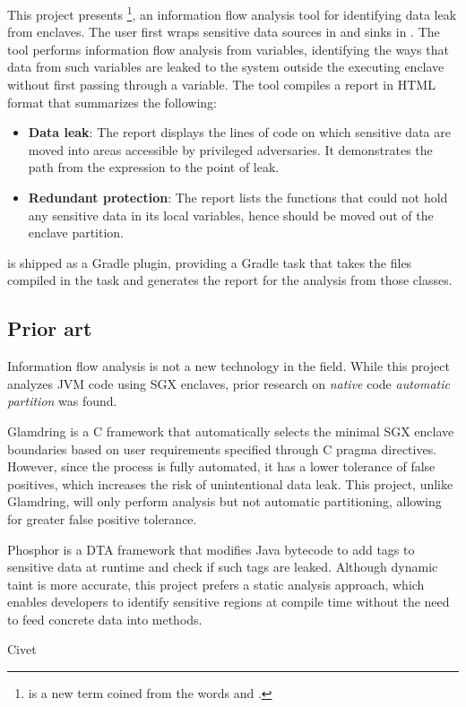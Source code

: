 This project presents \pname{}
\footnote{ is a new term coined from the words  and .},
an information flow analysis tool
for identifying data leak from enclaves.
The user first wraps sensitive data sources in  and sinks in .
The tool performs information flow analysis from  variables,
identifying the ways that data from such variables are leaked
to the system outside the executing enclave
without first passing through a  variable.
The tool compiles a report in HTML format that summarizes the following:
\begin{itemize}
	\item \textbf{Data leak}:
		The report displays the lines of code on which sensitive data are moved
		into areas accessible by privileged adversaries.
		It demonstrates the path from the  expression to the point of leak.
	\item \textbf{Redundant protection}:
		The report lists the functions that could not hold any sensitive data in its local variables,
		hence should be moved out of the enclave partition.
\end{itemize}

\pname{} is shipped as a Gradle plugin,
providing a Gradle task that
takes the  files compiled in the  task
and generates the report for the analysis from those classes.

\subsection{Prior art}
Information flow analysis is not a new technology in the field.
While this project analyzes JVM code using SGX enclaves,
prior research on \emph{native} code \emph{automatic partition} was found.

Glamdring \cite{glamdring} is a C framework that
automatically selects the minimal SGX enclave boundaries
based on user requirements specified through C pragma directives.
However, since the process is fully automated,
it has a lower tolerance of false positives,
which increases the risk of unintentional data leak.
This project, unlike Glamdring, will only perform analysis but not automatic partitioning,
allowing for greater false positive tolerance.

Phosphor \cite{BellJonathan2014Pidd} is a DTA framework
that modifies Java bytecode to add tags to sensitive data at runtime
and check if such tags are leaked.
Although dynamic taint is more accurate,
this project prefers a static analysis approach,
which enables developers to identify sensitive regions at compile time
without the need to feed concrete data into methods.

Civet \cite{civet}
